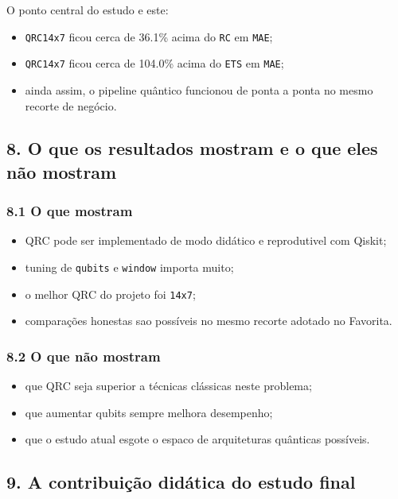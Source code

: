 \documentclass[12pt]{article}
\providecommand{\tightlist}{%
  \setlength{\itemsep}{0pt}\setlength{\parskip}{0pt}}
\begin{document}
O ponto central do estudo e este:

\begin{itemize}
\tightlist
\item
  \texttt{QRC14x7} ficou cerca de 36.1\% acima do \texttt{RC} em \texttt{MAE};
\item
  \texttt{QRC14x7} ficou cerca de 104.0\% acima do \texttt{ETS} em \texttt{MAE};
\item
  ainda assim, o pipeline quântico funcionou de ponta a ponta no mesmo recorte de negócio.
\end{itemize}

\subsection{8. O que os resultados mostram e o que eles não mostram}\label{8-o-que-os-resultados-mostram-e-o-que-eles-nuxe3o-mostram}

\subsubsection{8.1 O que mostram}\label{81-o-que-mostram}

\begin{itemize}
\tightlist
\item
  QRC pode ser implementado de modo didático e reprodutivel com Qiskit;
\item
  tuning de \texttt{qubits} e \texttt{window} importa muito;
\item
  o melhor QRC do projeto foi \texttt{14x7};
\item
  comparações honestas sao possíveis no mesmo recorte adotado no Favorita.
\end{itemize}

\subsubsection{8.2 O que não mostram}\label{82-o-que-nuxe3o-mostram}

\begin{itemize}
\tightlist
\item
  que QRC seja superior a técnicas clássicas neste problema;
\item
  que aumentar qubits sempre melhora desempenho;
\item
  que o estudo atual esgote o espaco de arquiteturas quânticas possíveis.
\end{itemize}

\subsection{9. A contribuição didática do estudo final}\label{9-a-contribuiuxe7uxe3o-diduxe1tica-do-estudo-final}
\end{document}
